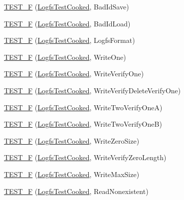 \begin{DoxyCompactItemize}
\item 
\hyperlink{group___unit_tests_ga6f8e4fff0ee826ffd2f764af9d8d971f}{T\-E\-S\-T\-\_\-\-F} (\hyperlink{class_logfs_test_cooked}{Logfs\-Test\-Cooked}, Bad\-Id\-Save)
\item 
\hyperlink{group___unit_tests_ga2ae66629b7714cae9e6b7fa7513e582a}{T\-E\-S\-T\-\_\-\-F} (\hyperlink{class_logfs_test_cooked}{Logfs\-Test\-Cooked}, Bad\-Id\-Load)
\item 
\hyperlink{group___unit_tests_gacaef9b0357724dd62343d2e2c12228f6}{T\-E\-S\-T\-\_\-\-F} (\hyperlink{class_logfs_test_cooked}{Logfs\-Test\-Cooked}, Logfs\-Format)
\item 
\hyperlink{group___unit_tests_gaad108bf9d51537e7a021406dbb72ba8d}{T\-E\-S\-T\-\_\-\-F} (\hyperlink{class_logfs_test_cooked}{Logfs\-Test\-Cooked}, Write\-One)
\item 
\hyperlink{group___unit_tests_ga648a4ec4fd8c6237d8ca35746dd64a9d}{T\-E\-S\-T\-\_\-\-F} (\hyperlink{class_logfs_test_cooked}{Logfs\-Test\-Cooked}, Write\-Verify\-One)
\item 
\hyperlink{group___unit_tests_ga3445631e0cef3272b085ad6f9db3157b}{T\-E\-S\-T\-\_\-\-F} (\hyperlink{class_logfs_test_cooked}{Logfs\-Test\-Cooked}, Write\-Verify\-Delete\-Verify\-One)
\item 
\hyperlink{group___unit_tests_ga1cf14f972876c023077641ba98e63c8b}{T\-E\-S\-T\-\_\-\-F} (\hyperlink{class_logfs_test_cooked}{Logfs\-Test\-Cooked}, Write\-Two\-Verify\-One\-A)
\item 
\hyperlink{group___unit_tests_ga48d1f17dec8bfe59c3012e8cb7d02c97}{T\-E\-S\-T\-\_\-\-F} (\hyperlink{class_logfs_test_cooked}{Logfs\-Test\-Cooked}, Write\-Two\-Verify\-One\-B)
\item 
\hyperlink{group___unit_tests_ga773670f215b2d6d437cf973b562e7208}{T\-E\-S\-T\-\_\-\-F} (\hyperlink{class_logfs_test_cooked}{Logfs\-Test\-Cooked}, Write\-Zero\-Size)
\item 
\hyperlink{group___unit_tests_ga079b8cc84786de4a97f3b1d2ead2aec1}{T\-E\-S\-T\-\_\-\-F} (\hyperlink{class_logfs_test_cooked}{Logfs\-Test\-Cooked}, Write\-Verify\-Zero\-Length)
\item 
\hyperlink{group___unit_tests_ga6ce60ecfc18738ead214a44d47a22c19}{T\-E\-S\-T\-\_\-\-F} (\hyperlink{class_logfs_test_cooked}{Logfs\-Test\-Cooked}, Write\-Max\-Size)
\item 
\hyperlink{group___unit_tests_ga2e5a9acaa02d2c2fa66d03adf200af24}{T\-E\-S\-T\-\_\-\-F} (\hyperlink{class_logfs_test_cooked}{Logfs\-Test\-Cooked}, Read\-Nonexistent)
\item 

\end{DoxyCompactItemize}
